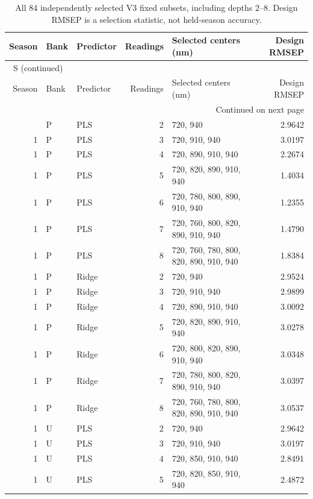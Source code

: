 \documentclass[10pt,a4paper]{article}
\renewcommand{\thetable}{S\arabic{table}}
\begin{document}
\clearpage
\begin{landscape}
\begingroup\footnotesize
\setlength{\tabcolsep}{3.5pt}
\renewcommand{\arraystretch}{1.10}
\begin{longtable}{rllrlr}
\caption{All 84 independently selected V3 fixed subsets, including depths 2--8. Design RMSEP is a selection statistic, not held-season accuracy.}\label{tab:subsets}\\
\toprule
Season & Bank & Predictor & Readings & Selected centers (nm) & Design RMSEP \\
\midrule
\endfirsthead
\multicolumn{6}{l}{\tablename~\thetable{} (continued)}\\
\toprule
Season & Bank & Predictor & Readings & Selected centers (nm) & Design RMSEP \\
\midrule
\endhead
\midrule
\multicolumn{6}{r}{Continued on next page}\\
\endfoot
\bottomrule
\endlastfoot
1 & P & PLS & 2 & 720, 940 & 2.9642 \\
1 & P & PLS & 3 & 720, 910, 940 & 3.0197 \\
1 & P & PLS & 4 & 720, 890, 910, 940 & 2.2674 \\
1 & P & PLS & 5 & 720, 820, 890, 910, 940 & 1.4034 \\
1 & P & PLS & 6 & 720, 780, 800, 890, 910, 940 & 1.2355 \\
1 & P & PLS & 7 & 720, 760, 800, 820, 890, 910, 940 & 1.4790 \\
1 & P & PLS & 8 & 720, 760, 780, 800, 820, 890, 910, 940 & 1.8384 \\
1 & P & Ridge & 2 & 720, 940 & 2.9524 \\
1 & P & Ridge & 3 & 720, 910, 940 & 2.9899 \\
1 & P & Ridge & 4 & 720, 890, 910, 940 & 3.0092 \\
1 & P & Ridge & 5 & 720, 820, 890, 910, 940 & 3.0278 \\
1 & P & Ridge & 6 & 720, 800, 820, 890, 910, 940 & 3.0348 \\
1 & P & Ridge & 7 & 720, 780, 800, 820, 890, 910, 940 & 3.0397 \\
1 & P & Ridge & 8 & 720, 760, 780, 800, 820, 890, 910, 940 & 3.0537 \\
1 & U & PLS & 2 & 720, 940 & 2.9642 \\
1 & U & PLS & 3 & 720, 910, 940 & 3.0197 \\
1 & U & PLS & 4 & 720, 850, 910, 940 & 2.8491 \\
1 & U & PLS & 5 & 720, 820, 850, 910, 940 & 2.4872 \\

\end{longtable}
\end{landscape}
\end{document}
